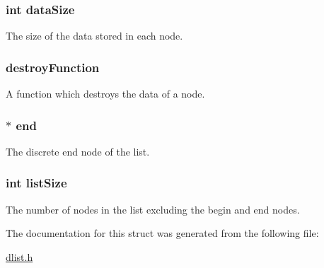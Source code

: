 \subsubsection[{\texorpdfstring{data\+Size}{dataSize}}]{\setlength{\rightskip}{0pt plus 5cm}int data\+Size}\hypertarget{struct_d_list_a8c8e474bb8d2c6f7162455416b488e50}{}\label{struct_d_list_a8c8e474bb8d2c6f7162455416b488e50}
The size of the data stored in each node. 
\subsubsection[{\texorpdfstring{destroy\+Function}{destroyFunction}}]{ destroy\+Function}\hypertarget{struct_d_list_a5b78562613cd563bb5f5dc1cbf721db8}{}\label{struct_d_list_a5b78562613cd563bb5f5dc1cbf721db8}
A function which destroys the data of a node. 
\subsubsection[{\texorpdfstring{end}{end}}]{$\ast$ end}\hypertarget{struct_d_list_acc55bec99edaf859fc9591ec29b4a46e}{}\label{struct_d_list_acc55bec99edaf859fc9591ec29b4a46e}
The discrete end node of the list. 
\subsubsection[{\texorpdfstring{list\+Size}{listSize}}]{\setlength{\rightskip}{0pt plus 5cm}int list\+Size}\hypertarget{struct_d_list_a91f8b044f23c2395ba7c1ee942b2456c}{}\label{struct_d_list_a91f8b044f23c2395ba7c1ee942b2456c}
The number of nodes in the list excluding the begin and end nodes. 

The documentation for this struct was generated from the following file\+:\begin{DoxyCompactItemize}
\item 
\hyperlink{dlist_8h}{dlist.\+h}\end{DoxyCompactItemize}
